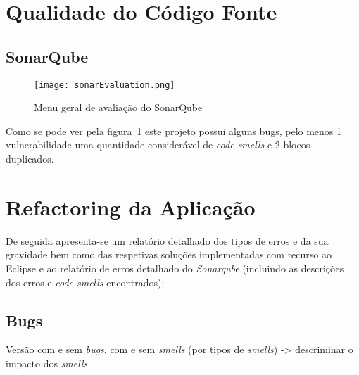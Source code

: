 \section{Qualidade do Código Fonte}

\subsection{SonarQube}

\begin{figure}[H]

  \centering

  \texttt{[image: sonarEvaluation.png]}

  \caption {Menu geral de avaliação do SonarQube}

  \label {fig01}

\end{figure}


\par Como se pode ver pela figura~\ref{fig01} este projeto possui alguns bugs, pelo menos 1 vulnerabilidade uma quantidade considerável de \textit{code smells} e 2 blocos duplicados.

\section{Refactoring da Aplicação}

De seguida apresenta-se um relatório detalhado dos tipos de erros e da sua gravidade bem como das respetivas soluções implementadas com recurso ao Eclipse e ao relatório de erros detalhado do \textit{Sonarqube} (incluindo as descrições dos erros e \textit{code smells} encontrados):

\subsection{Bugs}
Versão com e sem \textit{bugs}, com e sem \textit{smells} (por tipos de \textit{smells}) -> descriminar o impacto dos \textit{smells}
